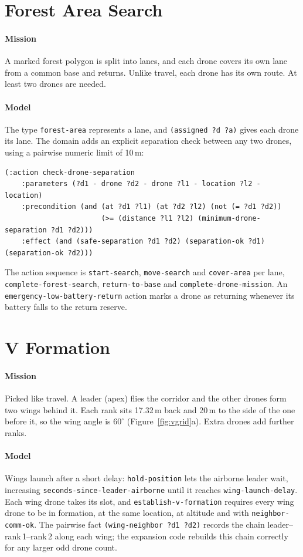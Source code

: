 \documentclass[11pt,a4paper,oneside]{report}
\newcommand{\code}[1]{\texttt{#1}}
\begin{document}
\section{Forest Area Search}
\paragraph{Mission}
A marked forest polygon is split into lanes, and each drone covers its own lane from a common
base and returns. Unlike travel, each drone has its own route. At least two drones are needed.

\paragraph{Model}
The type \code{forest-area} represents a lane, and \code{(assigned ?d ?a)} gives each drone its
lane. The domain adds an explicit separation check between any two drones, using a pairwise
numeric limit of 10\,m:

\begin{lstlisting}
(:action check-drone-separation
    :parameters (?d1 - drone ?d2 - drone ?l1 - location ?l2 - location)
    :precondition (and (at ?d1 ?l1) (at ?d2 ?l2) (not (= ?d1 ?d2))
                       (>= (distance ?l1 ?l2) (minimum-drone-separation ?d1 ?d2)))
    :effect (and (safe-separation ?d1 ?d2) (separation-ok ?d1) (separation-ok ?d2)))
\end{lstlisting}

\noindent The action sequence is \code{start-search}, \code{move-search} and \code{cover-area}
per lane, \code{complete-forest-search}, \code{return-to-base} and \code{complete-drone-mission}.
An \code{emergency-low-battery-return} action marks a drone as returning whenever its battery
falls to the return reserve.

\section{V Formation}
\paragraph{Mission}
Picked like travel. A leader (apex) flies the corridor and the other drones form two wings
behind it. Each rank sits 17.32\,m back and 20\,m to the side of the one before it, so the wing
angle is $60^\circ$ (Figure~\ref{fig:vgrid}a). Extra drones add further ranks.

\paragraph{Model}
Wings launch after a short delay: \code{hold-position} lets the airborne leader wait, increasing
\code{seconds-since-leader-airborne} until it reaches \code{wing-launch-delay}. Each wing drone
takes its slot, and \code{establish-v-formation} requires every wing drone to be in formation,
at the same location, at altitude and with \code{neighbor-comm-ok}. The pairwise fact
\code{(wing-neighbor ?d1 ?d2)} records the chain leader--rank\,1--rank\,2 along each wing; the
expansion code rebuilds this chain correctly for any larger odd drone count.
\end{document}
